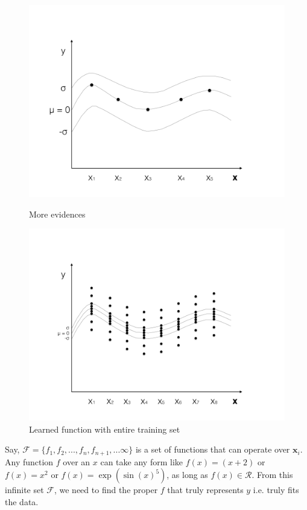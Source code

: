 \documentclass[english]{tktltiki}
\begin{document}
\begin{figure}[h!]
\begin{minipage}{.5\linewidth}
  \centering
  \includegraphics[width=\linewidth]{figures/GP_3.png}
  \caption{More evidences}
  \label{fig:sub1}
\end{minipage}%
\begin{minipage}{.5\linewidth}
  \centering
  \includegraphics[width=\linewidth]{figures/GP_4.png}
  \caption{Learned function with entire training set}
  \label{fig:sub2}
\end{minipage}

\label{fig:test}
\end{figure}

\fi

Say, $\mathcal{F} = \{f_1, f_2, ..., f_n, f_{n+1}, ... \infty\}$ is a set of functions that can operate over $\mathbf{x}_i$. Any function $f$ over an $x$ can take any form like $f(x) = (x + 2)$ or $f(x) = x^2$ or $f(x) = \exp(\sin(x)^5)$, as long as $f(x) \in \mathcal{R}$. From this infinite set $\mathcal{F}$, we need to find the proper $f$ that truly represents $y$ i.e. truly fits the data.
\end{document}
